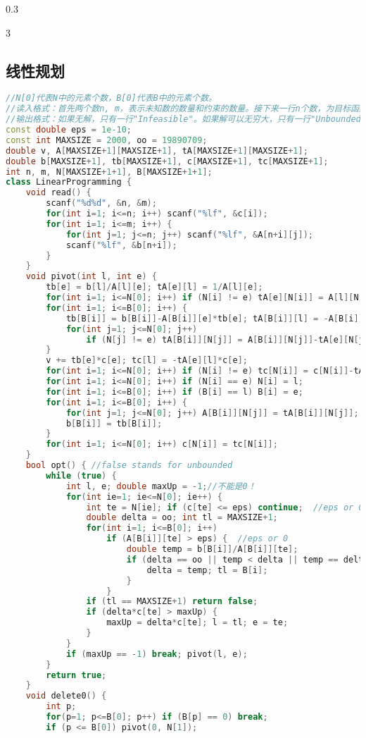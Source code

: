 \documentclass[landscape,a4paper]{article}
\begin{document}
\begin{spacing}{0.3}
\begin{multicols}{3}
	\subsection{线性规划}
\begin{lstlisting}[language=C++]
//N[0]代表N中的元素个数，B[0]代表B中的元素个数。
//读入格式：首先两个数n, m，表示未知数的数量和约束的数量。接下来一行n个数，为目标函数的系数。然后m行，每行m+1个数，表示一个约束。前m个数是系数，最后一个是常数项。
//输出格式：如果无解，只有一行"Infeasible"。如果解可以无穷大，只有一行"Unbounded"。否则，第一行为最大的目标函数值，接下来是每个未知数的值。
const double eps = 1e-10;
const int MAXSIZE = 2000, oo = 19890709;
double v, A[MAXSIZE+1][MAXSIZE+1], tA[MAXSIZE+1][MAXSIZE+1];
double b[MAXSIZE+1], tb[MAXSIZE+1], c[MAXSIZE+1], tc[MAXSIZE+1];
int n, m, N[MAXSIZE+1+1], B[MAXSIZE+1+1];
class LinearProgramming {
	void read() {
		scanf("%d%d", &n, &m);
		for(int i=1; i<=n; i++) scanf("%lf", &c[i]);
		for(int i=1; i<=m; i++) {
			for(int j=1; j<=n; j++) scanf("%lf", &A[n+i][j]);
			scanf("%lf", &b[n+i]);
		}
	}
	void pivot(int l, int e) {
		tb[e] = b[l]/A[l][e]; tA[e][l] = 1/A[l][e];
		for(int i=1; i<=N[0]; i++) if (N[i] != e) tA[e][N[i]] = A[l][N[i]]/A[l][e];
		for(int i=1; i<=B[0]; i++) {
			tb[B[i]] = b[B[i]]-A[B[i]][e]*tb[e]; tA[B[i]][l] = -A[B[i]][e]*tA[e][l];
			for(int j=1; j<=N[0]; j++)
				if (N[j] != e) tA[B[i]][N[j]] = A[B[i]][N[j]]-tA[e][N[j]]*A[B[i]][e];
		}
		v += tb[e]*c[e]; tc[l] = -tA[e][l]*c[e];
		for(int i=1; i<=N[0]; i++) if (N[i] != e) tc[N[i]] = c[N[i]]-tA[e][N[i]]*c[e];
		for(int i=1; i<=N[0]; i++) if (N[i] == e) N[i] = l;
		for(int i=1; i<=B[0]; i++) if (B[i] == l) B[i] = e;
		for(int i=1; i<=B[0]; i++) {
			for(int j=1; j<=N[0]; j++) A[B[i]][N[j]] = tA[B[i]][N[j]];
			b[B[i]] = tb[B[i]];
		}
		for(int i=1; i<=N[0]; i++) c[N[i]] = tc[N[i]];
	}
	bool opt() { //false stands for unbounded
		while (true) {
			int l, e; double maxUp = -1;//不能是0！
			for(int ie=1; ie<=N[0]; ie++) {
				int te = N[ie]; if (c[te] <= eps) continue;  //eps or 0
				double delta = oo; int tl = MAXSIZE+1;
				for(int i=1; i<=B[0]; i++)
					if (A[B[i]][te] > eps) {  //eps or 0
						double temp = b[B[i]]/A[B[i]][te];
						if (delta == oo || temp < delta || temp == delta && B[i] < tl) {
							delta = temp; tl = B[i];
						}
					}
				if (tl == MAXSIZE+1) return false;
				if (delta*c[te] > maxUp) {
					maxUp = delta*c[te]; l = tl; e = te;
				}
			}
			if (maxUp == -1) break; pivot(l, e);
		}
		return true;
	}
	void delete0() {
		int p;
		for(p=1; p<=B[0]; p++) if (B[p] == 0) break;
		if (p <= B[0]) pivot(0, N[1]);

\end{lstlisting}
\end{multicols}
\end{spacing}
\end{document}
